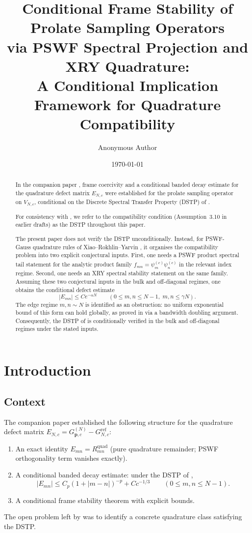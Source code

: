 \documentclass[12pt,a4paper]{amsart}
\title[Conditional Frame Stability via PSWF Spectral Projection]
      {Conditional Frame Stability of Prolate Sampling Operators\\
       via PSWF Spectral Projection and XRY Quadrature:\\
       A Conditional Implication Framework for Quadrature Compatibility}
\author{Anonymous Author}
\date{\today}
\theoremstyle{definition}
\newcommand{\GVM}{G^{(N)}_{\mathbf{p},c}}
\newcommand{\EN}{E_{N,c}}
\begin{document}
\maketitle

\begin{abstract}
In the companion paper \cite{PaperI}, frame coercivity and a conditional
banded decay estimate for the quadrature defect matrix $\EN$ were
established for the prolate sampling operator on $V_{N,c}$, conditional
on the Discrete Spectral Transfer Property (DSTP) of \cite{PaperI}.

For consistency with \cite{PaperI}, we refer to the compatibility
condition (Assumption~3.10 in earlier drafts) as the DSTP throughout
this paper.

The present paper does not verify the DSTP unconditionally.
Instead, for PSWF-Gauss quadrature rules of Xiao--Rokhlin--Yarvin
\cite{Xiao2001}, it organises the compatibility problem into two explicit
conjectural inputs. First, one needs a PSWF product spectral tail statement
for the analytic product family
$f_{mn}=\psi_m^{(c)}\overline{\psi_n^{(c)}}$ in the relevant index regime.
Second, one needs an XRY spectral stability statement on the same family.
Assuming these two conjectural inputs in the bulk and off-diagonal regimes,
one obtains the conditional defect estimate
\[
  |E_{mn}| \le C e^{-\alpha N} \qquad (0\le m,n\le N-1,\; m,n\le\gamma N).
\]
The edge regime $m,n\sim N$ is identified as an obstruction:
no uniform exponential bound of this form can hold globally,
as proved in \cite{PaperIII} via a bandwidth doubling argument.
Consequently, the DSTP of \cite{PaperI} is conditionally verified
in the bulk and off-diagonal regimes under the stated inputs.
\end{abstract}

\tableofcontents

\section{Introduction}

\subsection*{Context}

The companion paper \cite{PaperI} established the following structure
for the quadrature defect matrix $\EN = \GVM - G^{\mathrm{ref}}_{N,c}$:
\begin{enumerate}
\item An exact identity $E_{mn} = R_{mn}^{\mathrm{quad}}$
  (pure quadrature remainder; PSWF orthogonality term vanishes exactly).
\item A conditional banded decay estimate: under the DSTP of
  \cite{PaperI},
  \[
    |E_{mn}| \le C_p(1+|m-n|)^{-p} + Cc^{-1/3}
    \qquad (0 \le m,n \le N-1).
  \]
\item A conditional frame stability theorem with explicit bounds.
\end{enumerate}
The open problem left by \cite{PaperI} was to identify a concrete
quadrature class satisfying the DSTP.
\end{document}
